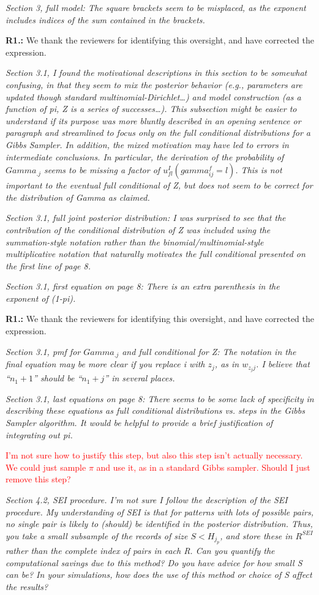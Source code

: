 \documentclass[letterpaper, parskip]{scrartcl}
\newcommand{\pointRaised}[1]{%
	\begin{tcolorbox}
		\itshape #1
	\end{tcolorbox}
}
\newcounter{responsectr}[section]     %
\newcommand{\reply}[2]{%
	\refstepcounter{responsectr}%
	\textbf{#1.\theresponsectr:} #2
}
\begin{document}
		\pointRaised{%
Section 3, full model: The square brackets seem to be misplaced, as the exponent includes
indices of the sum contained in the brackets.
}

		\reply{R1}{%
	We thank the reviewers for identifying this oversight, and have corrected the expression. 
}
		\pointRaised{%
Section 3.1, I found the motivational descriptions in this section to be somewhat confusing, in
that they seem to mix the posterior behavior (e.g., parameters are updated though standard
multinomial-Dirichlet…) and model construction (as a function of pi, Z is a series of successes…).
This subsection might be easier to understand if its purpose was more bluntly described in an
opening sentence or paragraph and streamlined to focus only on the full conditional
distributions for a Gibbs Sampler. In addition, the mixed motivation may have led to errors in
intermediate conclusions. In particular, the derivation of the probability of $Gamma_{.j}$ seems
to be missing a factor of $u_{fl}^I(gamma_{ij}^f=l)$. This is not important to the eventual full
conditional of Z, but does not seem to be correct for the distribution of Gamma as claimed.
}
		\pointRaised{%
Section 3.1, full joint posterior distribution: I was surprised to see that the contribution of the
conditional distribution of Z was included using the summation-style notation rather than the
binomial/multinomial-style multiplicative notation that naturally motivates the full conditional
presented on the first line of page 8.
}
		\pointRaised{%
Section 3.1, first equation on page 8: There is an extra parenthesis in the exponent of (1-pi).
}
		\reply{R1}{%
	We thank the reviewers for identifying this oversight, and have corrected the expression. 
}
		\pointRaised{%
Section 3.1, pmf for $Gamma_{.j}$ and full conditional for Z: The notation in the final equation
may be more clear if you replace i with $z_j$, as in $w_{z_j j}$. I believe that “$n_1+1$” should be “$n_1+ j$” in several places.
}
		\pointRaised{%
Section 3.1, last equations on page 8: There seems to be some lack of specificity in describing
these equations as full conditional distributions vs. steps in the Gibbs Sampler algorithm. It
would be helpful to provide a brief justification of integrating out pi.
}
\textcolor{red}{I'm not sure how to justify this step, but also this step isn't actually necessary. We could just sample $\pi$ and use it, as in a standard Gibbs sampler. Should I just remove this step?}

		\pointRaised{%
Section 4.2, SEI procedure. I’m not sure I follow the description of the SEI procedure. My understanding of SEI is that for patterns with lots of possible pairs, no single pair is likely to (should) be identified in the posterior distribution. Thus, you take a small subsample of the records of size $S < H_{j_p}$, and store these in $R^{SEI}$ rather than the complete index of pairs in
each R. Can you quantify the computational savings due to this method? Do you have advice for how small S can be? In your simulations, how does the use of this method or choice of S affect the results?}
\end{document}
